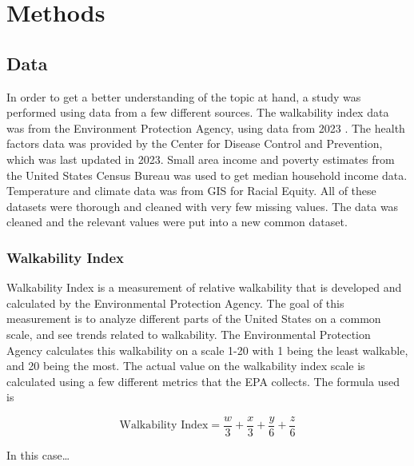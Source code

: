 \documentclass[
]{article}
\begin{document}
\section{Methods}\label{methods}

\subsection{Data}\label{data}

In order to get a better understanding of the topic at hand, a study was
performed using data from a few different sources. The walkability index
data was from the Environment Protection Agency, using data from 2023 .
The health factors data was provided by the Center for Disease Control
and Prevention, which was last updated in 2023. Small area income and
poverty estimates from the United States Census Bureau was used to get
median household income data. Temperature and climate data was from GIS
for Racial Equity. All of these datasets were thorough and cleaned with
very few missing values. The data was cleaned and the relevant values
were put into a new common dataset.

\subsubsection{Walkability Index}\label{walkability-index}

Walkability Index is a measurement of relative walkability that is
developed and calculated by the Environmental Protection Agency. The
goal of this measurement is to analyze different parts of the United
States on a common scale, and see trends related to walkability. The
Environmental Protection Agency calculates this walkability on a scale
1-20 with 1 being the least walkable, and 20 being the most. The actual
value on the walkability index scale is calculated using a few different
metrics that the EPA collects. The formula used is

\[\text{Walkability Index} = \frac{w}{3} + \frac{x}{3} +\frac{y}{6} + \frac{z}{6} \]

In this case\ldots{}
\end{document}
